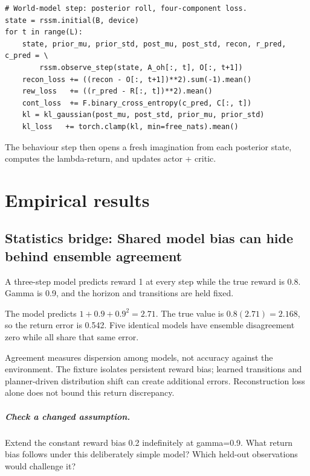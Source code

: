 \documentclass[11pt,oneside]{scrbook}
\begin{document}
\begin{codebox}
\begin{verbatim}
# World-model step: posterior roll, four-component loss.
state = rssm.initial(B, device)
for t in range(L):
    state, prior_mu, prior_std, post_mu, post_std, recon, r_pred, c_pred = \
        rssm.observe_step(state, A_oh[:, t], O[:, t+1])
    recon_loss += ((recon - O[:, t+1])**2).sum(-1).mean()
    rew_loss   += ((r_pred - R[:, t])**2).mean()
    cont_loss  += F.binary_cross_entropy(c_pred, C[:, t])
    kl = kl_gaussian(post_mu, post_std, prior_mu, prior_std)
    kl_loss   += torch.clamp(kl, min=free_nats).mean()
\end{verbatim}
\end{codebox}

The behaviour step then opens a fresh imagination from each posterior state, computes
the lambda-return, and updates actor + critic.

\chapter{Empirical results}

\section{Statistics bridge: Shared model bias can hide behind ensemble agreement}
\begin{example}
A three-step model predicts reward 1 at every step while the true reward is 0.8. Gamma is 0.9, and the horizon and transitions are held fixed.

The model predicts $1+0.9+0.9^2=2.71$. The true value is $0.8(2.71)=2.168$, so the return error is 0.542. Five identical models have ensemble disagreement zero while all share that same error.
\end{example}
Agreement measures dispersion among models, not accuracy against the environment. The fixture isolates persistent reward bias; learned transitions and planner-driven distribution shift can create additional errors. Reconstruction loss alone does not bound this return discrepancy.

\paragraph{Check a changed assumption.} Extend the constant reward bias 0.2 indefinitely at gamma=0.9. What return bias follows under this deliberately simple model? Which held-out observations would challenge it?
\end{document}
